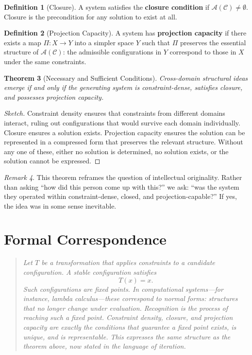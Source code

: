\documentclass[11pt]{book}
\theoremstyle{plain}
\newtheorem{theorem}{Theorem}[chapter]
\theoremstyle{definition}
\newtheorem{definition}[theorem]{Definition}
\theoremstyle{remark}
\newtheorem{remark}[theorem]{Remark}
\newcommand{\C}{\mathcal{C}}
\newcommand{\A}{\mathcal{A}}
\newenvironment{formalcorrespondence}
  {\begin{quote}\small\itshape}
  {\end{quote}}
\begin{document}
\begin{definition}[Closure]
A system satisfies the \textbf{closure condition} if $\A(\C) \neq \emptyset$.
Closure is the precondition for any solution to exist at all.
\end{definition}

\begin{definition}[Projection Capacity]
A system has \textbf{projection capacity} if there exists a map
$\Pi : X \to Y$ into a simpler space $Y$ such that $\Pi$ preserves the
essential structure of $\A(\C)$: the admissible configurations in $Y$
correspond to those in $X$ under the same constraints.
\end{definition}

\begin{theorem}[Necessary and Sufficient Conditions]
Cross-domain structural ideas emerge if and only if the generating system
is constraint-dense, satisfies closure, and possesses projection capacity.
\end{theorem}

\begin{proof}[Sketch]
Constraint density ensures that constraints from different domains interact,
ruling out configurations that would survive each domain individually.
Closure ensures a solution exists. Projection capacity ensures the solution
can be represented in a compressed form that preserves the relevant
structure. Without any one of these, either no solution is determined, no
solution exists, or the solution cannot be expressed.
\end{proof}

\begin{remark}
This theorem reframes the question of intellectual originality. Rather than
asking ``how did this person come up with this?'' we ask: ``was the system
they operated within constraint-dense, closed, and projection-capable?'' If
yes, the idea was in some sense inevitable.
\end{remark}

\section*{Formal Correspondence}
\begin{formalcorrespondence}
Let $T$ be a transformation that applies constraints to a candidate
configuration. A stable configuration satisfies
\[
  T(x) = x.
\]
Such configurations are fixed points. In computational systems---for
instance, lambda calculus---these correspond to normal forms: structures
that no longer change under evaluation. Recognition is the process of
reaching such a fixed point. Constraint density, closure, and projection
capacity are exactly the conditions that guarantee a fixed point exists,
is unique, and is representable. This expresses the same structure as
the theorem above, now stated in the language of iteration.
\end{formalcorrespondence}
\end{document}

